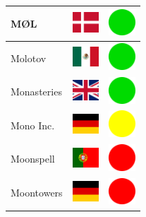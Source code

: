 \documentclass[12pt, a4paper, twoside]{report}
\begin{document}
\begin{center}
\begin{longtable}{|p{5cm}|p{2cm}|p{2cm}|}
			MØL & \includegraphics[width=1cm]{4x3/dk} & \includegraphics[width=1cm]{likes/y} \\ \hline
			Molotov & \includegraphics[width=1cm]{4x3/mx} & \includegraphics[width=1cm]{likes/y} \\ \hline
			Monasteries & \includegraphics[width=1cm]{4x3/gb} & \includegraphics[width=1cm]{likes/y} \\ \hline
			Mono Inc. & \includegraphics[width=1cm]{4x3/de} & \includegraphics[width=1cm]{likes/m} \\ \hline
			Moonspell & \includegraphics[width=1cm]{4x3/pt} & \includegraphics[width=1cm]{likes/n} \\ \hline
			Moontowers & \includegraphics[width=1cm]{4x3/de} & \includegraphics[width=1cm]{likes/n} \\ \hline

\end{longtable}
\end{center}
\end{document}
